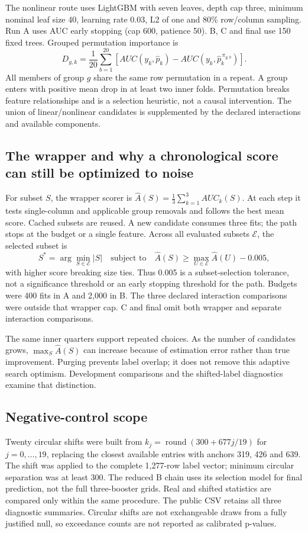 \documentclass[11pt,a4paper]{article}
\begin{document}
The nonlinear route uses LightGBM with seven leaves, depth cap three, minimum nominal leaf size 40, learning rate 0.03, L2 of one and 80\% row/column sampling. Run A uses AUC early stopping (cap 600, patience 50). B, C and final use 150 fixed trees. Grouped permutation importance is
\[
D_{g,k}=\frac1{20}\sum_{b=1}^{20}
\left[AUC(y_k,\hat p_k)-AUC(y_k,\hat p_k^{\,\pi_{g,b}})\right].
\]
All members of group $g$ share the same row permutation in a repeat. A group enters with positive mean drop in at least two inner folds. Permutation breaks feature relationships and is a selection heuristic, not a causal intervention. The union of linear/nonlinear candidates is supplemented by the declared interactions and available components.

\subsection*{The wrapper and why a chronological score can still be optimized to noise}
For subset $S$, the wrapper scorer is $\widehat A(S)=\frac13\sum_{k=1}^3 AUC_k(S)$. At each step it tests single-column and applicable group removals and follows the best mean score. Cached subsets are reused. A new candidate consumes three fits; the path stops at the budget or a single feature. Across all evaluated subsets $\mathcal E$, the selected subset is
\[
S^*=\arg\min_{S\in\mathcal E}|S|
\quad\text{subject to}\quad
\widehat A(S)\ge\max_{U\in\mathcal E}\widehat A(U)-0.005,
\]
with higher score breaking size ties. Thus 0.005 is a subset-selection tolerance, not a significance threshold or an early stopping threshold for the path. Budgets were 400 fits in A and 2,000 in B. The three declared interaction comparisons were outside that wrapper cap. C and final omit both wrapper and separate interaction comparisons.

The same inner quarters support repeated choices. As the number of candidates grows, $\max_S\widehat A(S)$ can increase because of estimation error rather than true improvement. Purging prevents label overlap; it does not remove this adaptive search optimism. Development comparisons and the shifted-label diagnostics examine that distinction.

\subsection*{Negative-control scope}
Twenty circular shifts were built from $k_j=\operatorname{round}(300+677j/19)$ for $j=0,\ldots,19$, replacing the closest available entries with anchors 319, 426 and 639. The shift was applied to the complete 1,277-row label vector; minimum circular separation was at least 300. The reduced B chain uses its selection model for final prediction, not the full three-booster grids. Real and shifted statistics are compared only within the same procedure. The public CSV retains all three diagnostic summaries. Circular shifts are not exchangeable draws from a fully justified null, so exceedance counts are not reported as calibrated p-values.
\end{document}
